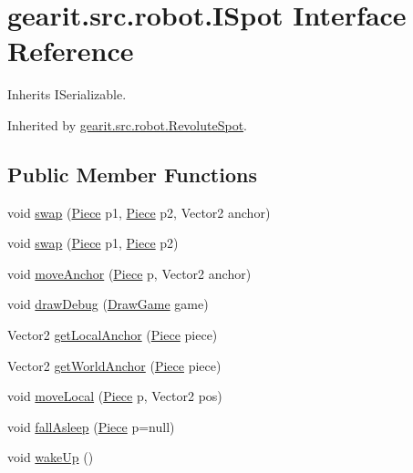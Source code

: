 \hypertarget{interfacegearit_1_1src_1_1robot_1_1_i_spot}{\section{gearit.\+src.\+robot.\+I\+Spot Interface Reference}
\label{interfacegearit_1_1src_1_1robot_1_1_i_spot}
}


Inherits I\+Serializable.



Inherited by \hyperlink{classgearit_1_1src_1_1robot_1_1_revolute_spot}{gearit.\+src.\+robot.\+Revolute\+Spot}.

\subsection*{Public Member Functions}
\begin{DoxyCompactItemize}
\item 
void \hyperlink{interfacegearit_1_1src_1_1robot_1_1_i_spot_a376f7f45503e8399ece710eec86a92a6}{swap} (\hyperlink{classgearit_1_1src_1_1robot_1_1_piece}{Piece} p1, \hyperlink{classgearit_1_1src_1_1robot_1_1_piece}{Piece} p2, Vector2 anchor)
\item 
void \hyperlink{interfacegearit_1_1src_1_1robot_1_1_i_spot_ab111577a2fc54ed840bb55923b3cdc91}{swap} (\hyperlink{classgearit_1_1src_1_1robot_1_1_piece}{Piece} p1, \hyperlink{classgearit_1_1src_1_1robot_1_1_piece}{Piece} p2)
\item 
void \hyperlink{interfacegearit_1_1src_1_1robot_1_1_i_spot_a415ce04e4fa36210bc6c803ed38402a7}{move\+Anchor} (\hyperlink{classgearit_1_1src_1_1robot_1_1_piece}{Piece} p, Vector2 anchor)
\item 
void \hyperlink{interfacegearit_1_1src_1_1robot_1_1_i_spot_a6cc2dbd23dc7b4fe0a210c81ea5fbc90}{draw\+Debug} (\hyperlink{classgearit_1_1src_1_1_draw_game}{Draw\+Game} game)
\item 
Vector2 \hyperlink{interfacegearit_1_1src_1_1robot_1_1_i_spot_a69f9d65b5cff9f469ef1eb6b74871ffe}{get\+Local\+Anchor} (\hyperlink{classgearit_1_1src_1_1robot_1_1_piece}{Piece} piece)
\item 
Vector2 \hyperlink{interfacegearit_1_1src_1_1robot_1_1_i_spot_a44f2de377b55c2af4282ffad70021653}{get\+World\+Anchor} (\hyperlink{classgearit_1_1src_1_1robot_1_1_piece}{Piece} piece)
\item 
void \hyperlink{interfacegearit_1_1src_1_1robot_1_1_i_spot_aca1a0f84fca17ce5a61cb4b14f38fe90}{move\+Local} (\hyperlink{classgearit_1_1src_1_1robot_1_1_piece}{Piece} p, Vector2 pos)
\item 
void \hyperlink{interfacegearit_1_1src_1_1robot_1_1_i_spot_acf6f318cfb83574fb0fdc51f31fe250a}{fall\+Asleep} (\hyperlink{classgearit_1_1src_1_1robot_1_1_piece}{Piece} p=null)
\item 
void \hyperlink{interfacegearit_1_1src_1_1robot_1_1_i_spot_a280205c7b3f5eee03c1192324cb6cf12}{wake\+Up} ()
\end{DoxyCompactItemize}
